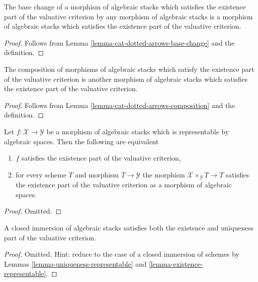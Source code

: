 \begin{lemma}
\label{lemma-base-change-existence}
The base change of a morphism of algebraic stacks which satisfies the
existence part of the valuative criterion by any morphism of
algebraic stacks is a morphism of algebraic stacks which satisfies the
existence part of the valuative criterion.
\end{lemma}

\begin{proof}
Follows from Lemma \ref{lemma-cat-dotted-arrows-base-change}
and the definition.
\end{proof}

\begin{lemma}
\label{lemma-composition-existence}
The composition of morphisms of algebraic stacks which satisfy the
existence part of the valuative criterion is another
morphism of algebraic stacks which satisfies the
existence part of the valuative criterion.
\end{lemma}

\begin{proof}
Follows from Lemma \ref{lemma-cat-dotted-arrows-composition}
and the definition.
\end{proof}

\begin{lemma}
\label{lemma-existence-representable}
Let $f : \mathcal{X} \to \mathcal{Y}$ be a morphism of algebraic stacks
which is representable by algebraic spaces. Then the following are equivalent
\begin{enumerate}
\item $f$ satisfies the existence part of the valuative criterion,
\item for every scheme $T$ and morphism $T \to \mathcal{Y}$
the morphism $\mathcal{X} \times_\mathcal{Y} T \to T$ satisfies
the existence part of the valuative criterion as a morphism
of algebraic spaces.
\end{enumerate}
\end{lemma}

\begin{proof}
Omitted.
\end{proof}

\begin{lemma}
\label{lemma-closed-immersion-valuative-criteria}
A closed immersion of algebraic stacks satisfies both
the existence and uniqueness part of the valuative criterion.
\end{lemma}

\begin{proof}
Omitted. Hint: reduce to the case of a closed immersion of
schemes by Lemmas \ref{lemma-uniqueness-representable} and
\ref{lemma-existence-representable}.
\end{proof}





